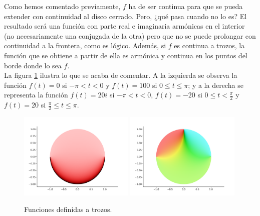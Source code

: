 Como hemos comentado previamente, $f$ ha de ser continua para que se pueda extender con continuidad al disco cerrado. Pero, ¿qué pasa cuando no lo es? El resultado será una función con parte real e imaginaria armónicas en el interior (no necesariamente una conjugada de la otra) pero que no se puede prolongar con continuidad a la frontera, como es lógico. Además, si $f$ es continua a trozos, la función que se obtiene a partir de ella es armónica y continua en los puntos del borde donde lo sea $f$. \\

La figura \ref{fig:atrozos} ilustra lo que se acaba de comentar. A la izquierda se observa la función $f(t) = 0$ si $- \pi < t < 0$ y $f(t) = 100$ si $0 \leq t \leq \pi$; y a la derecha se representa la función $f(t) = 20i$ si $- \pi < t < 0$, $f(t) = -20$ si $0 \leq t < \frac{\pi}{2}$ y $f(t) = 20$ si $\frac{\pi}{2} \leq t \leq \pi$. \\

\begin{figure}[!htbp]
    \centering
    \includegraphics[width=0.49\textwidth]{../Aplicacion/atrozos.png}
    \hfil
    \includegraphics[width=0.49\textwidth]{../Aplicacion/atrozos(2).png}
    \caption{Funciones definidas a trozos.}
    \label{fig:atrozos}
\end{figure}

